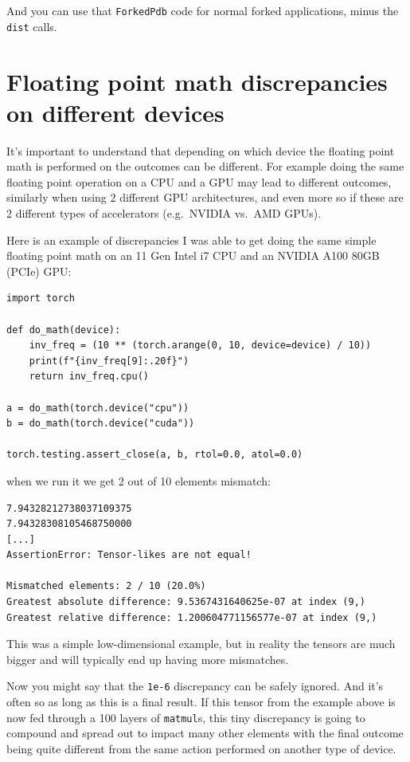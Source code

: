 \documentclass[
]{report}
\begin{document}
And you can use that \texttt{ForkedPdb} code for normal forked
applications, minus the \texttt{dist} calls.

\section{Floating point math discrepancies on different
devices}\label{floating-point-math-discrepancies-on-different-devices}

It's important to understand that depending on which device the floating
point math is performed on the outcomes can be different. For example
doing the same floating point operation on a CPU and a GPU may lead to
different outcomes, similarly when using 2 different GPU architectures,
and even more so if these are 2 different types of accelerators
(e.g.~NVIDIA vs.~AMD GPUs).

Here is an example of discrepancies I was able to get doing the same
simple floating point math on an 11 Gen Intel i7 CPU and an NVIDIA A100
80GB (PCIe) GPU:

\begin{verbatim}
import torch

def do_math(device):
    inv_freq = (10 ** (torch.arange(0, 10, device=device) / 10))
    print(f"{inv_freq[9]:.20f}")
    return inv_freq.cpu()

a = do_math(torch.device("cpu"))
b = do_math(torch.device("cuda"))

torch.testing.assert_close(a, b, rtol=0.0, atol=0.0)
\end{verbatim}

when we run it we get 2 out of 10 elements mismatch:

\begin{verbatim}
7.94328212738037109375
7.94328308105468750000
[...]
AssertionError: Tensor-likes are not equal!

Mismatched elements: 2 / 10 (20.0%)
Greatest absolute difference: 9.5367431640625e-07 at index (9,)
Greatest relative difference: 1.200604771156577e-07 at index (9,)
\end{verbatim}

This was a simple low-dimensional example, but in reality the tensors
are much bigger and will typically end up having more mismatches.

Now you might say that the \texttt{1e-6} discrepancy can be safely
ignored. And it's often so as long as this is a final result. If this
tensor from the example above is now fed through a 100 layers of
\texttt{matmul}s, this tiny discrepancy is going to compound and spread
out to impact many other elements with the final outcome being quite
different from the same action performed on another type of device.
\end{document}
